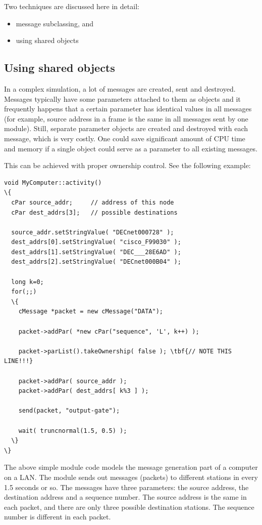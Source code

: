 Two techniques are discussed here in detail:
\begin{itemize}
\item{message subclassing, and}
\item{using shared objects}
\end{itemize}



\subsection{Using shared objects}

In a complex simulation, a lot of messages are created, sent and
destroyed. Messages typically have some parameters attached to them as
 objects and it frequently happens that a certain
parameter has identical values in all messages (for example, source
address in a frame is the same in all messages sent by one module).
Still, separate parameter objects are created and destroyed with each
message, which is very costly. One could save significant amount of
CPU time and memory if a single object could serve as a parameter to
all existing messages.


This can be achieved with proper ownership
control. See the following example:

\begin{Verbatim}[commandchars=\\\{\}]
void MyComputer::activity()
\{
  cPar source_addr;     // address of this node
  cPar dest_addrs[3];   // possible destinations

  source_addr.setStringValue( "DECnet000728" );
  dest_addrs[0].setStringValue( "cisco_F99030" );
  dest_addrs[1].setStringValue( "DEC___28E6AD" );
  dest_addrs[2].setStringValue( "DECnet000B04" );

  long k=0;
  for(;;)
  \{
    cMessage *packet = new cMessage("DATA");

    packet->addPar( *new cPar("sequence", 'L', k++) );

    packet->parList().takeOwnership( false ); \tbf{// NOTE THIS LINE!!!}

    packet->addPar( source_addr );
    packet->addPar( dest_addrs[ k%3 ] );

    send(packet, "output-gate");

    wait( truncnormal(1.5, 0.5) );
  \}
\}
\end{Verbatim}


The above simple module code models the message generation part 
of a computer on a LAN. The module sends out messages (packets) 
to different stations in every 1.5 seconds or so. The messages 
have three parameters: the source address, the destination address 
and a sequence number. The source address is the same in each 
packet, and there are only three possible destination stations. 
The sequence number is different in each packet.


